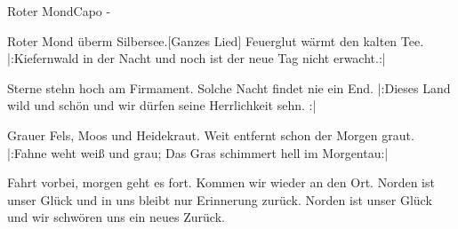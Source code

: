 \begin{song}{Roter Mond}{}{Capo -}

Roter Mond überm Silbersee.[Ganzes Lied]
Feuerglut wärmt den kalten Tee.
|:Kiefernwald in der Nacht
und noch ist der neue Tag nicht erwacht.:|

Sterne stehn hoch am Firmament.
Solche Nacht findet nie ein End.
|:Dieses Land wild und schön
und wir dürfen seine Herrlichkeit sehn. :|

Grauer Fels, Moos und Heidekraut.
Weit entfernt schon der Morgen graut.
|:Fahne weht weiß und grau;
Das Gras schimmert hell im Morgentau:|

Fahrt vorbei, morgen geht es fort.
Kommen wir wieder an den Ort.
Norden ist unser Glück
und in uns bleibt nur Erinnerung zurück.
Norden ist unser Glück
und wir schwören uns ein neues Zurück.


\end{song}